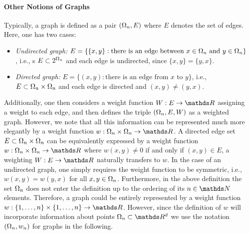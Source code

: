 \paragraph{Other Notions of Graphs}
Typically, a graph is defined as a pair $(\Omega_n,E)$ where $E$ denotes the set of edges. Here, 
one has two cases:
\begin{itemize}
\item \emph{Undirected graph:} $E=\{ \{x,y\}: \text{there is an edge between } x\in \Omega_n \text{ and } y\in \Omega_n\}$, i.e., s
$E\subset 2^{\Omega_n}$ and each edge is undirected, since $\{x,y\}=\{y,x\}$.
%
\item \emph{Directed graph:} $E=\{ (x,y): \text{there is an edge from } x \text{ to } y\}$, i.e.,
$E\subset \Omega_n\times \Omega_n$ and each edge is directed and $(x,y)\neq(y,x)$.
%
\end{itemize}
Additionally, one then considers a weight function $W:E\to\R$ assigning a weight to each edge, and then defines 
the triple $(\Omega_n,E,W)$ as a weighted graph. However, we note that all this information can be represented much more elegantly by a weight function $w:\domain_n\times \domain_n\to\R$. A directed edge set $E\subset \Omega_n\times \Omega_n$ can be equivalently expressed by 
a weight function $w:\domain_n\times \domain_n\to\R$ where $w(x,y)\neq 0$ if and only if $(x,y)\in E$, a weighting $W:E\to\R$ 
naturally transfers to $w$. In the case of an undirected graph, one simply requires the weight function to be symmetric, i.e., 
$w(x,y)=w(y,x)$ for all $x,y\in \Omega_n$.
%
Furthermore, in the above definition the set $\Omega_n$ does not enter the definition up to the  ordering of its $n\in \N$  elements. Therefore, a graph could be entirely represented by a weight function $w:\{1,\ldots,n\}\times\{1,\ldots,n\}\to\R$. However, since the definition of $w$ will incorporate information about points $\domain_n\subset\R^d$ we use the notation $(\Omega_n, w_n)$ for graphs in the following.
%
%
%
